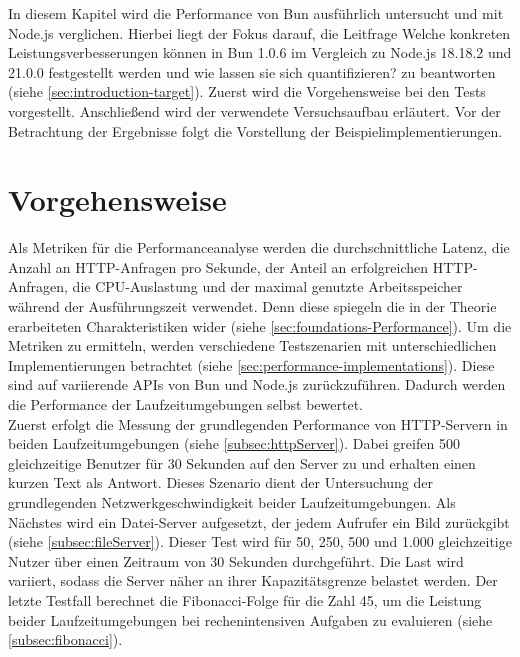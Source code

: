  \label{ch:performanceAnalysis}
In diesem Kapitel wird die Performance von Bun ausführlich untersucht und mit Node.js verglichen. Hierbei liegt der Fokus darauf, die Leitfrage \glqq Welche konkreten Leistungsverbesserungen können in Bun 1.0.6 im Vergleich zu Node.js 18.18.2 und 21.0.0 festgestellt werden und wie lassen sie sich quantifizieren?\grqq{} zu beantworten (siehe \autoref{sec:introduction-target}). Zuerst wird die Vorgehensweise bei den Tests vorgestellt. Anschließend wird der verwendete Versuchsaufbau erläutert. Vor der Betrachtung der Ergebnisse folgt die Vorstellung der Beispielimplementierungen.


\section{Vorgehensweise} \label{sec:performance-approach}
Als Metriken für die Performanceanalyse werden die durchschnittliche Latenz, die Anzahl an HTTP-Anfragen pro Sekunde, der Anteil an erfolgreichen HTTP-Anfragen, die CPU-Auslastung und der maximal genutzte Arbeitsspeicher während der Ausführungszeit verwendet. Denn diese spiegeln die in der Theorie erarbeiteten Charakteristiken wider (siehe \autoref{sec:foundations-Performance}). Um die Metriken zu ermitteln, werden verschiedene Testszenarien mit unterschiedlichen Implementierungen betrachtet (siehe \autoref{sec:performance-implementations}). Diese sind auf variierende APIs von Bun und Node.js zurückzuführen. Dadurch werden die Performance der Laufzeitumgebungen selbst bewertet.\\

\noindent
Zuerst erfolgt die Messung der grundlegenden Performance von HTTP-Servern in beiden Laufzeitumgebungen (siehe \autoref{subsec:httpServer}). Dabei greifen 500 gleichzeitige Benutzer für 30 Sekunden auf den Server zu und erhalten einen kurzen Text als Antwort. Dieses Szenario dient der Untersuchung der grundlegenden Netzwerkgeschwindigkeit beider Laufzeitumgebungen. Als Nächstes wird ein Datei-Server aufgesetzt, der jedem Aufrufer ein Bild zurückgibt (siehe \autoref{subsec:fileServer}). Dieser Test wird für 50, 250, 500 und 1.000 gleichzeitige Nutzer über einen Zeitraum von 30 Sekunden durchgeführt. Die Last wird variiert, sodass die Server näher an ihrer Kapazitätsgrenze belastet werden. Der letzte Testfall berechnet die Fibonacci-Folge für die Zahl 45, um die Leistung beider Laufzeitumgebungen bei rechenintensiven Aufgaben zu evaluieren (siehe \autoref{subsec:fibonacci}).

